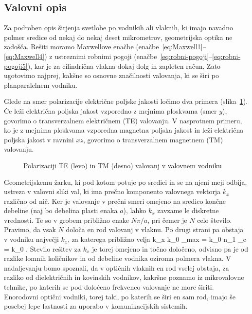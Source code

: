 \subsection*{Valovni opis}
Za podroben opis širjenja svetlobe po vodnikih ali vlaknih, 
ki imajo navadno polmer
sredice od nekaj do nekaj deset mikrometrov, geometrijska optika ne
zadošča. Rešiti moramo Maxwellove enačbe (enačbe~\ref{eq:Maxwell1}--\ref{eq:Maxwell4}) 
z ustreznimi robnimi pogoji (enačbe~\ref{eq:robni-pogoji}--\ref{eq:robni-pogoji5}),
kar je za cilindrična vlakna dokaj dolg in zapleten račun. Zato ugotovimo najprej, kakšne
so osnovne značilnosti valovanja, ki se širi po planparalelnem vodniku.

Glede na smer polarizacije električne poljske jakosti 
ločimo dva primera (slika~\ref{fig:TETM}). Če leži električna poljska
jakost vzporedno z mejnima ploskvama (smer $y$), 
govorimo o transverzalnem električnem (TE) valovanju. 
V nasprotnem primeru, ko je 
z mejnima ploskvama vzporedna magnetna poljska jakost in 
leži električna poljska jakost v ravnini $xz$, 
govorimo o transverzalnem magnetnem (TM) valovanju.
\begin{figure}[h]
\centering
\def\svgwidth{140truemm} 

\caption{Polarizaciji TE (levo) in TM (desno) valovanj v valovnem vodniku}
\label{fig:TETM}
\end{figure}

Geometrijskemu žarku, ki pod kotom potuje po sredici in se na njeni meji
odbija, ustreza v valovni sliki val, ki ima prečno komponento valovnega
vektorja $k_{x}$ različno od nič. Ker je valovanje v prečni smeri 
omejeno na sredico končne debeline (naj bo debelina plasti enaka $a$), lahko
$k_{x}$ zavzame le diskretne vrednosti. Te so v grobem približno enake $N\pi/a$, pri čemer je $N$
celo število. Pravimo, da vsak $N$ določa en rod valovanj v vlaknu. Po drugi strani 
pa obstaja v vodniku največji $k_x$, za katerega približno velja
\beq
k_{x } \approx k_0 \sin\alpha_{\rm max} = 
k_0 n_1 \cos\vartheta_c = k_0 .
\eeq
Število rešitev za $k_x$ je torej omejeno in točno določeno, odvisno
pa je od razlike lomnih količnikov in od debeline vodnika oziroma polmera vlakna. 
V nadaljevanju bomo spoznali, da v optičnih vlaknih en rod vselej obstaja,
za razliko od dielektričnih in kovinskih vodnikov, kakršne
poznamo iz mikrovalovne tehnike, po katerih se pod določeno frekvenco
valovanje ne more širiti. Enorodovni optični vodniki, torej taki, po katerih se širi
en sam rod, imajo še posebej lepe lastnosti za uporabo v komunikacijskih
sistemih.

